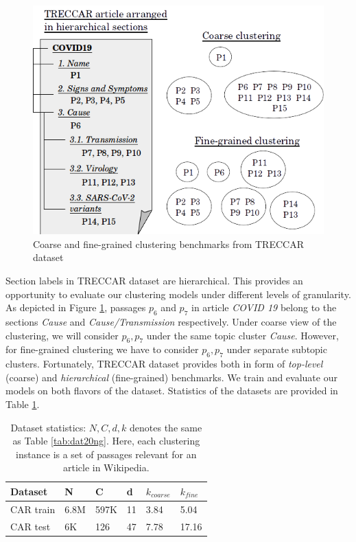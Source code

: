\documentclass[11pt,a4paper]{article}
\begin{document}
\begin{figure}[t]
    \centering
    \includegraphics[scale=0.5]{acl-ijcnlp2021-templates/wiki_articles.png}
    \caption{Coarse and fine-grained clustering benchmarks from TRECCAR dataset}
    \label{fig:wiki}
\end{figure}

Section labels in TRECCAR dataset are hierarchical. This provides an opportunity to evaluate our clustering models under different levels of granularity. As depicted in Figure \ref{fig:wiki}, passages $p_6$ and $p_7$ in article \textit{COVID 19} belong to the sections \textit{Cause} and \textit{Cause/Transmission} respectively. Under coarse view of the clustering, we will consider $p_6,p_7$ under the same topic cluster \textit{Cause}. However, for fine-grained clustering we have to consider $p_6,p_7$ under separate subtopic clusters. Fortunately, TRECCAR dataset provides both in form of \textit{top-level} (coarse) and \textit{hierarchical} (fine-grained) benchmarks. We train and evaluate our models on both flavors of the dataset. Statistics of the datasets are provided in Table \ref{tab:dat}.

\begin{table}[h]
\caption{Dataset statistics: $N,C,d,k$ denotes the same as Table \ref{tab:dat20ng}. Here, each clustering instance is a set of passages relevant for an article in Wikipedia.}
\begin{tabular}{llllll}
\hline
Dataset & N & C & d & $k_{coarse}$ & $k_{fine}$ \\ \hline
CAR train  & 6.8M & 597K & 11 & 3.84 & 5.04 \\
CAR test   & 6K & 126 & 47 & 7.78 & 17.16   
\end{tabular}
\label{tab:dat}
\end{table}
\end{document}
